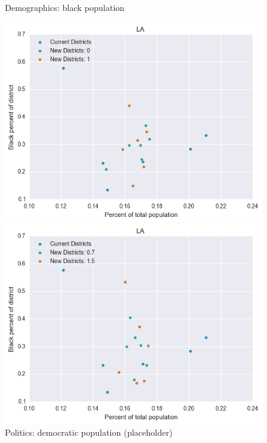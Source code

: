 \begin{figure}[htb!] \centering
\caption{ Demographics: black population }
\includegraphics[width=4.5in]{../analysis/LA/analysis_scatter.png}
\caption{ Politics: democratic population (placeholder)}
\includegraphics[width=4.5in]{../analysis/LA/analysis_scatter2.png}
\end{figure}

\clearpage
\newpage


